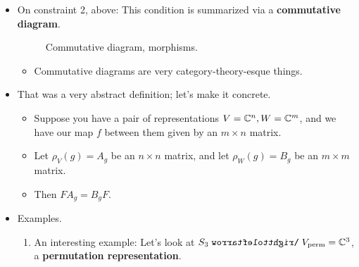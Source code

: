 \documentclass[../notes.tex]{subfiles}
\begin{document}
\begin{itemize}
\begin{enumerate}
        \item $f$ is linear;
        \item $f$ respects the structure of the representations; explicitly, for every $g\in G$, $\rho_V(g)\circ f=f\circ\rho_W(g)$\footnote{Recall that the object, $\rho_V(g)$ is a linear map! Thus, it can be composed with other linear maps like $f$.}.
    \end{enumerate}
    \item On constraint 2, above: This condition is summarized via a \textbf{commutative diagram}.
    \begin{figure}[h!]
        \centering
        \DisableQuotes
        \EnableQuotes
        \vspace{-1.5em}
        \caption{Commutative diagram, morphisms.}
        \label{fig:CDmorphisms}
    \end{figure}
    \begin{itemize}
        \item Commutative diagrams are very category-theory-esque things.
    \end{itemize}
    \item That was a very abstract definition; let's make it concrete.
    \begin{itemize}
        \item Suppose you have a pair of representations $V=\mathbb{C}^n,W=\mathbb{C}^m$, and we have our map $f$ between them given by an $m\times n$ matrix.
        \item Let $\rho_V(g)=A_g$ be an $n\times n$ matrix, and let $\rho_W(g)=B_g$ be an $m\times m$ matrix.
        \item Then $FA_g=B_gF$.
    \end{itemize}
    \item Examples.
    \begin{enumerate}
        \item An interesting example: Let's look at $S_3\acts V_\text{perm}=\C^3$, a \textbf{permutation representation}.

\end{enumerate}
\end{itemize}
\end{document}
